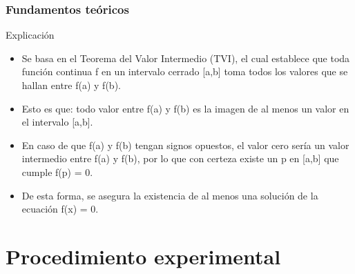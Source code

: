 \documentclass{beamer}
\begin{document}
\begin{frame}

\frametitle{Fundamentos teóricos}

\begin{block}{Explicación}
  \begin{itemize}
  \item
    Se basa en el Teorema del Valor Intermedio (TVI), el cual establece que toda función continua f en un intervalo cerrado [a,b] toma todos los valores que se hallan entre f(a) y f(b). 
  \pause

  \item
    Esto es que: todo valor entre f(a) y f(b) es la imagen de al menos un valor en el intervalo [a,b]. 
  \pause

  \item
    En caso de que f(a) y f(b) tengan signos opuestos, el valor cero sería un valor intermedio entre f(a) y f(b), por lo que con certeza existe un p en [a,b] que cumple f(p) = 0. 
  \pause

  \item
    De esta forma, se asegura la existencia de al menos una solución de la ecuación f(x) = 0.
  \end{itemize}
\end{block}

\end{frame}

\section{Procedimiento experimental}
\end{document}
